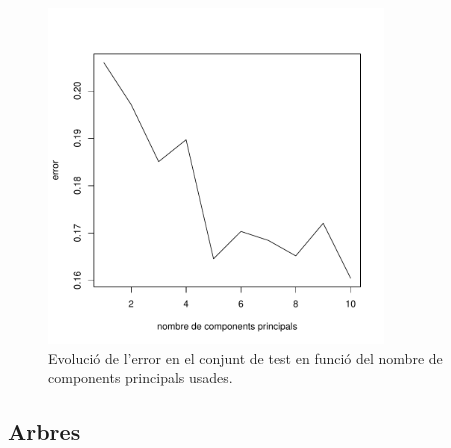 \documentclass[a4paper,10pt]{article}
\begin{document}
\begin{figure}
\centering
\includegraphics[width=3.5in]{memoria-nn_princomp}
\caption{Evolució de l'error en el conjunt de test en funció del nombre de components principals usades.} \label{fig:nn_roc}
\end{figure}


\subsection{Arbres}
\end{document}
